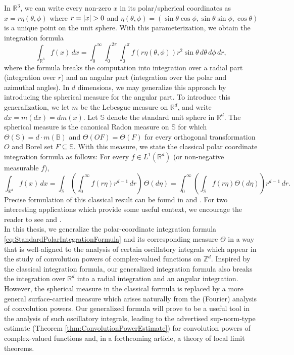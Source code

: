 \documentclass[11pt, letter]{book}
\begin{document}
In $\mathbb{R}^3$, we can write every non-zero $x$ in its polar/spherical coordinates as $x=r\eta(\theta,\phi)$ where $r=\abs{x}>0$ and $\eta(\theta,\phi)=(\sin\theta \cos\phi,\sin\theta \sin\phi,\cos\theta)$ is a unique point on the unit sphere. With this parameterization, we obtain the integration formula 
\begin{equation*}
    \int_{\mathbb{R}^3} f(x)\,dx = \int_{0}^\infty \int_{0}^{2\pi} \int_0^{\pi} f(r\eta(\theta,\phi)) r^2 \sin\theta \,d\theta\, d\phi \, dr,
\end{equation*}
where the formula breaks the computation into integration over a radial part (integration over $r$) and an angular part (integration over the polar and azimuthal angles). In $d$ dimensions, we may generalize this approach by introducing the spherical measure for the angular part.  To introduce this generalization, we let $m$ be the Lebesgue measure on $\mathbb{R}^d$, and write $dx=m(dx)=dm(x)$. Let $\mathbb{S}$ denote the standard unit sphere in $\mathbb{R}^d$. The spherical measure is the canonical Radon measure on $\mathbb{S}$ for which $\Theta(\mathbb{S})=d\cdot m(\mathbb{B})$ and $\Theta(OF)=\Theta(F)$ for every orthogonal transformation $O$ and Borel set $F\subseteq\mathbb{S}$. With this measure, we state the classical polar coordinate integration formula as follows: For every $f\in L^1(\mathbb{R}^d)$ (or non-negative measurable $f$),
\begin{equation}\label{eq:StandardPolarIntegrationFormula}
\int_{\mathbb{R}^d}f(x)\,dx=\int_{\mathbb{S}}\left(\int_0^\infty f(r\eta)r^{d-1}\,dr\right)\,\Theta(d\eta)=\int_0^\infty\left(\int_\mathbb{S}f(r\eta)\Theta(d\eta)\right)r^{d-1}\,dr.
\end{equation}
Precise formulation of this classical result can be found in \cite{stein_real_2009} and \cite{folland_real_2013}. For two interesting applications which provide some useful context, we encourage the reader to see \cite{baker_integration_1997} and \cite{folland_how_2001}.\\




\noindent In this thesis, we generalize the polar-coordinate integration formula \eqref{eq:StandardPolarIntegrationFormula} and its corresponding measure $\Theta$ in a way that is well-aligned to the analysis of certain oscillatory integrals which appear in the study of convolution powers of complex-valued functions on $\mathbb{Z}^d$. Inspired by the classical integration formula, our generalized integration formula also breaks the integration over $\mathbb{R}^d$ into a radial integration and an angular integration. However, the spherical measure in the classical formula is replaced by a more general surface-carried measure which arises naturally from the (Fourier) analysis of convolution powers. Our generalized formula will prove to be a useful tool in the analysis of such oscillatory integrals, leading to the advertised sup-norm-type estimate (Theorem \ref{thm:ConvolutionPowerEstimate}) for convolution powers of complex-valued functions and, in a forthcoming article, a theory of local limit theorems.\\ 
\end{document}
